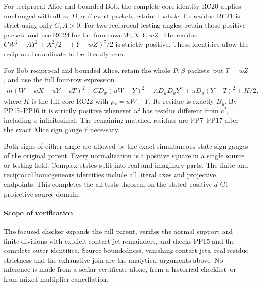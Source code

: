 For reciprocal Alice and bounded Bob, the complete core identity
RC20 applies unchanged with all $m,D,\alpha,\beta$ event packets
retained whole. Its residue RC21 is strict using only $C,A>0$.
For two reciprocal testing angles, retain those positive packets
and use RC24 for the four rows $W,X,Y,wZ$. The residue
$CW^2+AY^2+X^2/2+(Y-wZ)^2/2$ is strictly positive.
These identities allow the reciprocal coordinate to be literally zero.

For Bob reciprocal and bounded Alice, retain the whole $D,\beta$
packets, put $T=wZ$, and use the full four-row expression
\[
\begin{split}
 m(W-wX+uY-uT)^2+CD_w(uW-Y)^2
          +AD_uD_wY^2+\alpha D_u(Y-T)^2+K/2,
\end{split}
\]
where $K$ is the full core RC22 with $\rho_*=uW-Y$.
Its residue is exactly $B_u$. By PP15--PP16 it is strictly
positive whenever $u^2$ has residue different from $\bar c^2$,
including $u$ infinitesimal. The remaining matched residues are
PP7--PP17 after the exact Alice sign gauge if necessary.

Both signs of either angle are allowed by the exact simultaneous
state sign gauges of the original parent. Every normalization is
a positive square in a single source or testing field. Complex
states split into real and imaginary parts. The finite and
reciprocal homogeneous identities include all literal axes and
projective endpoints. This completes the all-tests theorem on the
stated positive-$d$ C1 projective source domain.

\paragraph{Scope of verification.}
The focused checker expands the full parent, verifies the normal
support and finite divisions with explicit contact-jet remainders,
and checks PP15 and the complete outer identities. Source
boundedness, vanishing contact jets, real-residue strictness and
the exhaustive join are the analytical arguments above. No
inference is made from a scalar certificate alone, from a
historical checklist, or from mixed multiplier cancellation.
